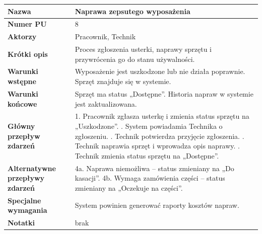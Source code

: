 \documentclass{article}
\begin{document}
    \begin{tabular}{|m{10em}|m{20em}|}
        \hline
        \textbf{Nazwa} & Naprawa zepsutego wyposażenia \\
        \hline
        \textbf{Numer PU} & 8 \\
        \hline
        \textbf{Aktorzy} & Pracownik, Technik \\
        \hline
        \textbf{Krótki opis} & Proces zgłoszenia usterki, naprawy sprzętu i przywrócenia go do stanu używalności. \\
        \hline
        \textbf{Warunki wstępne} & Wyposażenie jest uszkodzone lub nie działa poprawnie. Sprzęt znajduje się w systemie. \\
        \hline
        \textbf{Warunki końcowe} & Sprzęt ma status „Dostępne”. Historia napraw w systemie jest zaktualizowana. \\
        \hline
        \textbf{Główny przepływ zdarzeń} & 
            1. Pracownik zgłasza usterkę i zmienia status sprzętu na „Uszkodzone”. \newline
            2. System powiadamia Technika o zgłoszeniu. \newline
            3. Technik potwierdza przyjęcie zgłoszenia. \newline
            4. Technik naprawia sprzęt i wprowadza opis naprawy. \newline
            5. Technik zmienia status sprzętu na „Dostępne”. \\
        \hline
        \textbf{Alternatywne przepływy zdarzeń} & 
            4a. Naprawa niemożliwa – status zmieniany na „Do kasacji”. \newline
            4b. Wymaga zamówienia części – status zmieniany na „Oczekuje na części”. \\
        \hline
        \textbf{Specjalne wymagania} & System powinien generować raporty kosztów napraw. \\
        \hline
        \textbf{Notatki} & brak \\
        \hline
    \end{tabular}
\end{document}

